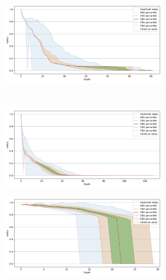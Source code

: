 \begin{figure}[ht!]
\begin{subfigure}[b]{0.47\textwidth}
    \label{fig:results:sift-radius}
    \end{subfigure}%
    \begin{subfigure}[b]{0.47\textwidth}
    \includegraphics[width=0.95\textwidth]{images/radius/radio-ml-97920.png}\\
    \label{fig:results:radioml-radius}
    \end{subfigure}%
    \\
    \begin{subfigure}[b]{0.47\textwidth}
    \includegraphics[width=0.95\textwidth]{images/radius/silva-2224640.png}\\
    \label{fig:results:silva-radius}
    \end{subfigure}%
    \begin{subfigure}[b]{0.47\textwidth}
    \includegraphics[width=0.95\textwidth]{images/radius/random-1000000.png}\\

\end{subfigure}
\end{figure}
